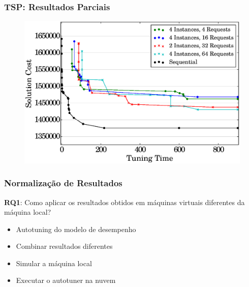 \documentclass[10pt, compress]{beamer}
\begin{document}
\begin{frame}[fragile]
  \frametitle{TSP: Resultados Parciais}
  \begin{figure}[H]
      \centering
      \includegraphics[width=.8\textwidth]{i4_p_n_comparison}
  \end{figure}
\end{frame}

\begin{frame}[fragile]
  \frametitle{Normalização de Resultados}
  \textbf{RQ1}: Como aplicar os resultados obtidos em máquinas virtuais
  \alert{diferentes da máquina local}?

  \begin{itemize}
      \item Autotuning do \alert{modelo de desempenho}
      \item \alert{Combinar} resultados diferentes
      \item \alert{Simular} a máquina local
      \item Executar o autotuner na \alert{nuvem}
  \end{itemize}
\end{frame}


\maketitle
\end{document}
